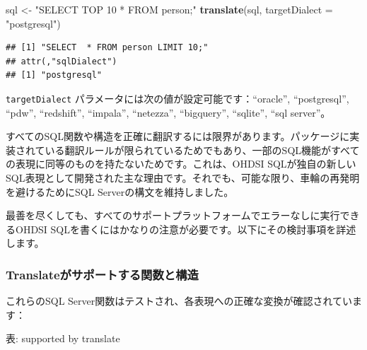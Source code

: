 \documentclass[
  11pt]{book}
\makeatletter
\newenvironment{Shaded}{\begin{snugshade}}{\end{snugshade}}
\newcommand{\AttributeTok}[1]{\textcolor[rgb]{0.13,0.29,0.53}{#1}}
\newcommand{\FunctionTok}[1]{\textcolor[rgb]{0.13,0.29,0.53}{\textbf{#1}}}
\newcommand{\NormalTok}[1]{#1}
\newcommand{\OtherTok}[1]{\textcolor[rgb]{0.56,0.35,0.01}{#1}}
\newcommand{\StringTok}[1]{\textcolor[rgb]{0.31,0.60,0.02}{#1}}
\newenvironment{kframe}{%
\medskip{}
\setlength{\fboxsep}{.8em}
 \def\at@end@of@kframe{}%
 \ifinner\ifhmode%
  \def\at@end@of@kframe{\end{minipage}}%
  \begin{minipage}{\columnwidth}%
 \fi\fi%
 \def\FrameCommand##1{\hskip\@totalleftmargin \hskip-\fboxsep
 \colorbox{myShadeColor}{##1}\hskip-\fboxsep
     \hskip-\linewidth \hskip-\@totalleftmargin \hskip\columnwidth}%
 \MakeFramed {\advance\hsize-\width
   \@totalleftmargin\z@ \linewidth\hsize
   \@setminipage}}%
 {\par\unskip\endMakeFramed%
 \at@end@of@kframe}
\newenvironment{rmdblock}[1]
  {
  \begin{itemize}
  \renewcommand{\labelitemi}{
    \raisebox{-.7\height}[0pt][0pt]{
      {\setkeys{Gin}{width=3em,keepaspectratio}\texttt{[image: images/\#1]}}
    }
  }
  \setlength{\fboxsep}{1em}
  \begin{kframe}
  \item
  }
  {
  \end{kframe}
  \end{itemize}
  }
\newenvironment{rmdimportant}
  {\begin{rmdblock}{important}}
  {\end{rmdblock}}
\theoremstyle{definition}
\theoremstyle{definition}
\theoremstyle{definition}
\theoremstyle{definition}
\theoremstyle{remark}
\makeatother
\begin{document}
\begin{Shaded}
\begin{Highlighting}[]
\NormalTok{sql }\OtherTok{\textless{}{-}} \StringTok{"SELECT TOP 10 * FROM person;"}
\FunctionTok{translate}\NormalTok{(sql, }\AttributeTok{targetDialect =} \StringTok{"postgresql"}\NormalTok{)}
\end{Highlighting}
\end{Shaded}

\begin{verbatim}
## [1] "SELECT  * FROM person LIMIT 10;"
## attr(,"sqlDialect")
## [1] "postgresql"
\end{verbatim}

\texttt{targetDialect} パラメータには次の値が設定可能です：``oracle'', ``postgresql'', ``pdw'', ``redshift'', ``impala'', ``netezza'', ``bigquery'', ``sqlite'', ``sql server''。 

\begin{rmdimportant}
すべてのSQL関数や構造を正確に翻訳するには限界があります。パッケージに実装されている翻訳ルールが限られているためでもあり、一部のSQL機能がすべての表現に同等のものを持たないためです。これは、OHDSI SQLが独自の新しいSQL表現として開発された主な理由です。それでも、可能な限り、車輪の再発明を避けるためにSQL Serverの構文を維持しました。
\end{rmdimportant}

最善を尽くしても、すべてのサポートプラットフォームでエラーなしに実行できるOHDSI SQLを書くにはかなりの注意が必要です。以下にその検討事項を詳述します。

\subsubsection*{Translateがサポートする関数と構造}\label{translateux304cux30b5ux30ddux30fcux30c8ux3059ux308bux95a2ux6570ux3068ux69cbux9020}

これらのSQL Server関数はテストされ、各表現への正確な変換が確認されています：

表: \label{tab:sqlFunctions} supported by translate
\end{document}
